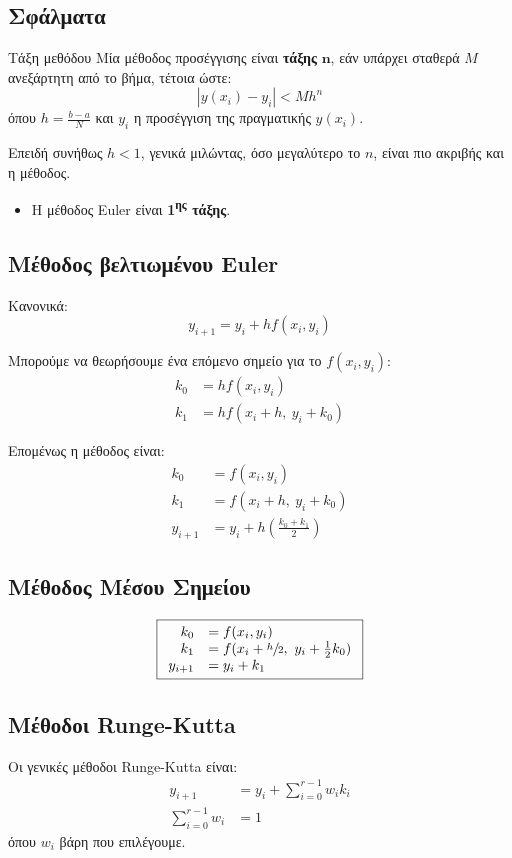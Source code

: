 \documentclass[11pt,a4paper,notitlepage,fleqn]{article}
\begin{document}
\subsection{Σφάλματα}
\begin{defn}{Τάξη μεθόδου}{}
	Μία μέθοδος προσέγγισης είναι \textbf{τάξης} \( \mathbf n \),
	εάν υπάρχει σταθερά \( M \) ανεξάρτητη από το βήμα, τέτοια ώστε:
	\[
	\left|y(x_i)-y_i\right| < Mh^n
	\]
	όπου \( h = \frac{b-a}{N} \) και \( y_i \) η προσέγγιση της
	πραγματικής \( y(x_i) \).
\end{defn}

Επειδή συνήθως \( h<1 \), γενικά μιλώντας, όσο μεγαλύτερο το \( n \),
είναι πιο ακριβής και η μέθοδος.

\begin{itemize}
	\item Η μέθοδος Euler είναι \textbf{1\textsuperscript{ης} τάξης}.
\end{itemize}

\subsection{Μέθοδος βελτιωμένου Euler}
Κανονικά:
\[
y_{i+1} = y_i + hf(x_i,y_i)
\]

Μπορούμε να θεωρήσουμε ένα επόμενο σημείο για το \( f(x_i,y_i) \):
\begin{align*}
	k_0 &= hf(x_i,y_i) \\
	k_1 &= hf(x_i+h,\ y_i+k_0)
\end{align*}

Επομένως η μέθοδος είναι:
\[
\boxed{\begin{array}{rl}
	k_0 &= f(x_i,y_i) \\
	k_1 &= f(x_i+h,\ y_i+k_0) \\
	y_{i+1} &= y_i + h \left(\frac{k_0+k_1}{2}\right)
	\end{array}}
\]

\subsection{Μέθοδος Μέσου Σημείου}
\[
\boxed{\begin{array}{rl}
	k_0 &= f(x_i,y_i) \\
	k_1 &= f(x_i+\sfrac{h}{2} ,\ y_i+\frac{1}{2}k_0) \\
	y_{i+1} &= y_i + k_1
	\end{array}}
\]

\subsection{Μέθοδοι Runge-Kutta}
Οι γενικές μέθοδοι Runge-Kutta είναι:
\begin{align*}
	y_{i+1} &= y_i +\sum_{i=0}^{r-1}w_ik_i \\
	\sum_{i=0}^{r-1} w_i &= 1
\end{align*}
όπου \( w_i \) βάρη που επιλέγουμε.
\end{document}
